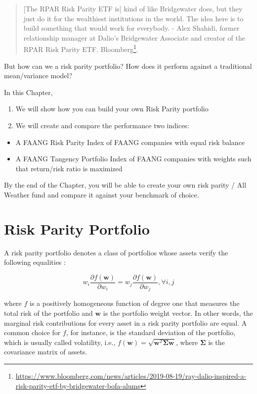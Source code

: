 \documentclass[]{book}
\DeclareRobustCommand{\href}[2]{#2\footnote{\url{#1}}}
\providecommand{\tightlist}{%
  \setlength{\itemsep}{0pt}\setlength{\parskip}{0pt}}
\theoremstyle{definition}
\theoremstyle{definition}
\theoremstyle{definition}
\theoremstyle{remark}
\begin{document}
\begin{quote}
{[}The RPAR Risk Parity ETF is{]} kind of like Bridgewater does, but
they just do it for the wealthiest institutions in the world. The idea
here is to build something that would work for everybody. - Alex
Shahidi, former relationship manager at Dalio's Bridgewater Associate
and creator of the RPAR Risk Parity ETF.
\href{https://www.bloomberg.com/news/articles/2019-08-19/ray-dalio-inspired-a-risk-parity-etf-by-bridgewater-bofa-alums}{Bloomberg}.
\end{quote}

But how can we a risk parity portfolio? How does it perform against a
traditional mean/variance model?

In this Chapter,

\begin{enumerate}
\def\labelenumi{\arabic{enumi}.}
\tightlist
\item
  We will show how you can build your own Risk Parity portfolio
\item
  We will create and compare the performance two indices:
\end{enumerate}

\begin{itemize}
\tightlist
\item
  A FAANG Risk Parity Index of FAANG companies with equal risk balance
\item
  A FAANG Tangency Portfolio Index of FAANG companies with weights such
  that return/risk ratio is maximized
\end{itemize}

By the end of the Chapter, you will be able to create your own risk
parity / All Weather fund and compare it against your benchmark of
choice.

\section{Risk Parity Portfolio}\label{risk-parity-portfolio}

A risk parity portfolio denotes a class of portfolios whose assets
verify the following equalities \citep{R-riskParityPortfolio}:

\begin{equation}
w_{i} \frac{\partial f(\mathbf{w})}{\partial w_{i}}=w_{j} \frac{\partial f(\mathbf{w})}{\partial w_{j}}, \forall i, j
\end{equation}

where \(f\) is a positively homogeneous function of degree one that
measures the total risk of the portfolio and \(\mathbf{w}\) is the
portfolio weight vector. In other words, the marginal risk contributions
for every asset in a risk parity portfolio are equal. A common choice
for \(f\), for instance, is the standard deviation of the portfolio,
which is usually called volatility, i.e.,
\(f(\mathbf{w})=\sqrt{\mathbf{w}^{T} \mathbf{\Sigma} \mathbf{w}}\),
where \(\mathbf{\Sigma}\) is the covariance matrix of assets.
\end{document}
